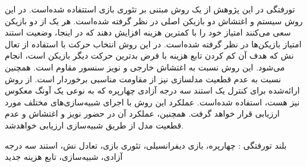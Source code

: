 


\pagestyle{empty}

\begin{وسط‌چین}
\end{وسط‌چین}

‌تورفتگی در این پژوهش از یک روش مبتنی بر تئوری بازی استتفاده شده‌است. در این روش سیستم و اغتشاش دو بازیکن اصلی در نظر گرفته شده‌است. هر یک از دو بازیکن سعی می‌کنند امتیاز خود را  با کمترین هزینه افزایش دهند که در اینجا،  وضعیت استند امتیاز بازیکن‌ها در نظر گرفته ‌شده‌است. در این روش انتخاب حرکت با استفاده از تعال نش
 که هدف آن کم کردن تابع هزینه با فرض بدترین حرکت دیگر بازیکن است،  انجام می‌شود.
این روش نسبت به اغتشاش خارجی و 
نویز سنسور مقاوم است. همچنین نسبت به عدم قطعیت مدلسازی نیز از مقاومت مناسبی برخوردار است. از روش ارائه‌شده برای کنترل یک استند سه درجه آزادی چهارپره که به نوعی یک آونگ معكوس نیز هست، استفاده شده‌است. 
عملكرد این روش با اجرای شبیه‌سازی‌های مختلف مورد ارزیابی قرار خواهد گرفت. همچنین، عملكرد آن 
در حضور نویز و اغتشاش و عدم قطعیت مدل از طریق شبیه‌سازی ارزیابی خواهد‌شد.

‌بلند
‌تورفتگی : 
چهارپره،  بازی دیفرانسیلی، تئوری بازی، تعادل نش، استند سه درجه آزادی، شبیه‌سازی، تابع هزینه 
‌جدید
